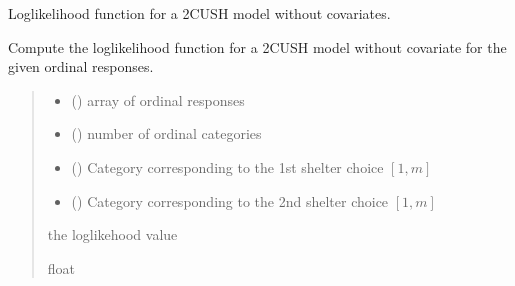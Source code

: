 \documentclass[letterpaper,10pt,english]{sphinxmanual}
\begin{document}

\begin{fulllineitems}
\label{\detokenize{cubmods:cubmods.cush2.loglik}}
\pysigstartsignatures
{}
\pysigstopsignatures
\sphinxAtStartPar
Log\sphinxhyphen{}likelihood function for a 2\sphinxhyphen{}CUSH model without covariates.

\sphinxAtStartPar
Compute the log\sphinxhyphen{}likelihood function for a 2\sphinxhyphen{}CUSH model 
without covariate for the given ordinal responses.
\begin{quote}\begin{description}
\begin{itemize}
\item {} 
\sphinxAtStartPar
{} () \textendash{} array of ordinal responses

\item {} 
\sphinxAtStartPar
{} () \textendash{} number of ordinal categories

\item {} 
\sphinxAtStartPar
{} () \textendash{} Category corresponding to the 1st shelter choice \([1,m]\)

\item {} 
\sphinxAtStartPar
{} () \textendash{} Category corresponding to the 2nd shelter choice \([1,m]\)

\end{itemize}

\sphinxAtStartPar
the log\sphinxhyphen{}likehood value

\sphinxAtStartPar
float

\end{description}\end{quote}

\end{fulllineitems}
\end{document}

